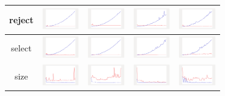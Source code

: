 \begin{longtable}{ c|c c c c}
reject
&
\includegraphics[width=1.6cm]{graphs/sequence/small/Reject}
&
\includegraphics[width=1.6cm]{graphs/set/small/Reject}
&
\includegraphics[width=1.6cm]{graphs/bag/small/Reject}
&
\includegraphics[width=1.6cm]{graphs/orderedset/small/Reject}
\\\hline

select
&
\includegraphics[width=1.6cm]{graphs/sequence/small/Select}
&
\includegraphics[width=1.6cm]{graphs/set/small/Select}
&
\includegraphics[width=1.6cm]{graphs/bag/small/Select}
&
\includegraphics[width=1.6cm]{graphs/orderedset/small/Select}
\\\hline

size
&
\includegraphics[width=1.6cm]{graphs/sequence/small/Size}
&
\includegraphics[width=1.6cm]{graphs/set/small/Size}
&
\includegraphics[width=1.6cm]{graphs/bag/small/Size}
&
\includegraphics[width=1.6cm]{graphs/orderedset/small/Size}
\\\hline


\end{longtable}
